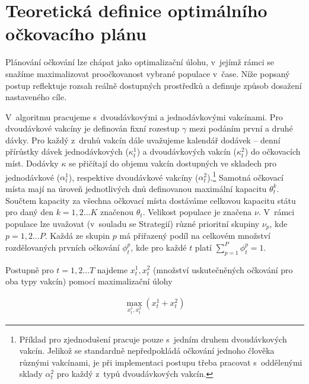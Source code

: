 \section*{Teoretická definice optimálního očkovacího plánu} 
\label{sec_vypocet}

Plánování očkování lze chápat jako optimalizační úlohu, v~jejímž rámci se snažíme maximalizovat proočkovanost vybrané populace v~čase. Níže popsaný postup reflektuje rozsah reálně dostupných prostředků a definuje způsob dosažení nastaveného cíle.


V~algoritmu pracujeme s~dvoudávkovými a jednodávkovými vakcínami. Pro dvou\-dáv\-ko\-vé vakcíny je definován fixní rozestup $\gamma$ mezi podáním první a druhé dávky. Pro každý z~druhů vakcín dále uvažujeme kalendář dodávek -- denní přírůstky dávek jednodávkových ($\kappa_{t}^{1}$) a dvoudávkových vakcín ($\kappa_{t}^{2}$) do očkovacích míst. Dodávky $\kappa$ se přičítají do objemu vakcín dostupných ve skladech pro jednodávkové ($\alpha_{t}^{1}$), respektive dvoudávkové vakcíny ($\alpha_{t}^{2}$).\footnote{Příklad pro zjednodušení pracuje pouze s~jedním druhem dvoudávkových vakcín. Jelikož se standardně nepředpokládá očkování jednoho člověka různými vakcínami, je při implementaci postupu třeba pracovat s~oddělenými sklady $\alpha_{t}^{2}$ pro každý z~typů dvoudávkových vakcín.} 
Samotná očkovací místa mají na úroveň jednotlivých dnů definovanou maximální kapacitu $\theta_{t}^{k}$. Součtem kapacity za všechna očkovací místa dostáváme celkovou kapacitu státu pro daný den $k=1,2 \dots K$ značenou $\theta_{t}$.
%
Velikost populace je značena $\nu$. V~rámci populace lze uvažovat (v~souladu se Strategií) různé prioritní skupiny $\nu_{p}$, kde $p=1,2\dots P$. Každá ze skupin $p$ má přiřazený podíl na celkovém množství rozdělovaných prvních očkování $\phi_{t}^{p}$, kde pro každé $t$ platí $\sum_{p=1}^{P}\phi_{t}^{p}=1$. 

%
Postupně pro $t=1,2 \dots T$ najdeme $x_{t}^{1},x_{t}^{2}$ (množství uskutečněných očkování pro oba typy vakcín) pomocí maximalizační úlohy

\begin{equation}
\begin{aligned}
\max_{x_{t}^{1},x_{t}^{2}}(x_{t}^{1}+x_{t}^{2})
\end{aligned}
\end{equation}

